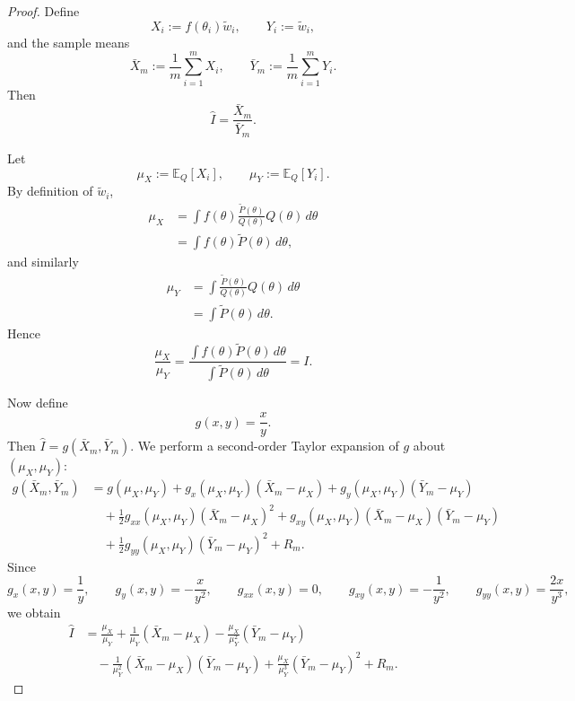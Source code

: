 \documentclass[11pt, titlepage]{article} %
\numberwithin{equation}{section}
\theoremstyle{definition}
\numberwithin{assumption}{section}
\begin{document}
\begin{proof}
Define
\begin{equation*}
    X_i:=f(\theta_i)\tilde w_i,
    \qquad
    Y_i:=\tilde w_i,
\end{equation*}
and the sample means
\begin{equation*}
    \bar X_m:=\frac{1}{m}\sum_{i=1}^m X_i,
    \qquad
    \bar Y_m:=\frac{1}{m}\sum_{i=1}^m Y_i.
\end{equation*}
Then
\begin{equation*}
    \hat I=\frac{\bar X_m}{\bar Y_m}.
\end{equation*}

Let
\begin{equation*}
    \mu_X:=\mathbb{E}_Q[X_i],
    \qquad
    \mu_Y:=\mathbb{E}_Q[Y_i].
\end{equation*}
By definition of $\tilde w_i$,
\begin{align*}
    \mu_X
    &= \int f(\theta)\frac{\tilde P(\theta)}{Q(\theta)}Q(\theta)\,d\theta\\
    &= \int f(\theta)\tilde P(\theta)\,d\theta,
\end{align*}
and similarly
\begin{align*}
    \mu_Y
    &= \int \frac{\tilde P(\theta)}{Q(\theta)}Q(\theta)\,d\theta\\
    &= \int \tilde P(\theta)\,d\theta.
\end{align*}
Hence
\begin{equation*}
    \frac{\mu_X}{\mu_Y}
    =
    \frac{\int f(\theta)\tilde P(\theta)\,d\theta}{\int \tilde P(\theta)\,d\theta}
    = I.
\end{equation*}

Now define
\begin{equation*}
    g(x,y)=\frac{x}{y}.
\end{equation*}
Then $\hat I=g(\bar X_m,\bar Y_m)$. We perform a second-order Taylor expansion of $g$ about $(\mu_X,\mu_Y)$:
\begin{align*}
    g(\bar X_m,\bar Y_m)
    &=
    g(\mu_X,\mu_Y)
    +g_x(\mu_X,\mu_Y)(\bar X_m-\mu_X)
    +g_y(\mu_X,\mu_Y)(\bar Y_m-\mu_Y)\\
    &\quad
    +\frac{1}{2}g_{xx}(\mu_X,\mu_Y)(\bar X_m-\mu_X)^2
    +g_{xy}(\mu_X,\mu_Y)(\bar X_m-\mu_X)(\bar Y_m-\mu_Y)\\
    &\quad
    +\frac{1}{2}g_{yy}(\mu_X,\mu_Y)(\bar Y_m-\mu_Y)^2
    +R_m.
\end{align*}
Since
\begin{equation*}
    g_x(x,y)=\frac{1}{y},
    \qquad
    g_y(x,y)=-\frac{x}{y^2},
    \qquad
    g_{xx}(x,y)=0,
    \qquad
    g_{xy}(x,y)=-\frac{1}{y^2},
    \qquad
    g_{yy}(x,y)=\frac{2x}{y^3},
\end{equation*}
we obtain
\begin{align*}
    \hat I
    &=
    \frac{\mu_X}{\mu_Y}
    +\frac{1}{\mu_Y}(\bar X_m-\mu_X)
    -\frac{\mu_X}{\mu_Y^2}(\bar Y_m-\mu_Y)\\
    &\quad
    -\frac{1}{\mu_Y^2}(\bar X_m-\mu_X)(\bar Y_m-\mu_Y)
    +\frac{\mu_X}{\mu_Y^3}(\bar Y_m-\mu_Y)^2
    +R_m.
\end{align*}


\end{proof}
\end{document}
